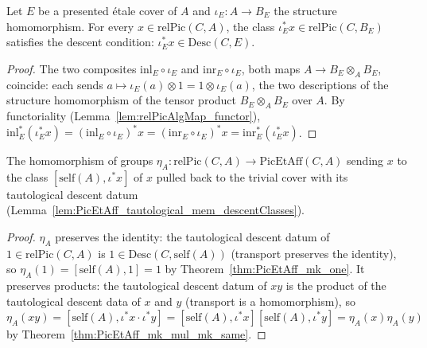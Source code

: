 \begin{lemma}
  \label{lem:PicEtAff_tautological_mem_descentClasses}
  \leanok
  Let \(E\) be a presented \'etale cover of \(A\) and \(\iota_E \colon A \to B_E\) the
  structure homomorphism. For every \(x \in \mathrm{relPic}(C,A)\), the class
  \(\iota_E^{*}x \in \mathrm{relPic}(C,B_E)\) satisfies the descent condition:
  \(\iota_E^{*}x \in \mathrm{Desc}(C,E)\).
\end{lemma}
\begin{proof}
  \leanok
  The two composites \(\mathrm{inl}_E \circ \iota_E\) and \(\mathrm{inr}_E \circ \iota_E\), both
  maps \(A \to B_E \otimes_A B_E\), coincide: each sends \(a \mapsto \iota_E(a) \otimes 1 = 1
  \otimes \iota_E(a)\), the two descriptions of the structure homomorphism of the tensor
  product \(B_E \otimes_A B_E\) over \(A\). By functoriality (Lemma~\ref{lem:relPicAlgMap_functor}),
  \(\mathrm{inl}_E^{*}(\iota_E^{*}x) = (\mathrm{inl}_E \circ \iota_E)^{*}x = (\mathrm{inr}_E
  \circ \iota_E)^{*}x = \mathrm{inr}_E^{*}(\iota_E^{*}x)\).
\end{proof}

\begin{definition}
  \label{def:PicEtAff_unit}
  \leanok
  The homomorphism of groups \(\eta_A \colon \mathrm{relPic}(C,A) \to
  \mathrm{PicEtAff}(C,A)\) sending \(x\) to the class \([\mathrm{self}(A), \iota^{*}x]\) of \(x\)
  pulled back to the trivial cover with its tautological descent datum
  (Lemma~\ref{lem:PicEtAff_tautological_mem_descentClasses}).
\end{definition}
\begin{proof}
  \leanok
  \(\eta_A\) preserves the identity: the tautological descent datum of \(1 \in
  \mathrm{relPic}(C,A)\) is \(1 \in \mathrm{Desc}(C,\mathrm{self}(A))\) (transport preserves
  the identity), so \(\eta_A(1) = [\mathrm{self}(A),1] = 1\) by
  Theorem~\ref{thm:PicEtAff_mk_one}. It preserves products: the tautological descent datum of
  \(xy\) is the product of the tautological descent data of \(x\) and \(y\) (transport is a
  homomorphism), so \(\eta_A(xy) = [\mathrm{self}(A), \iota^{*}x \cdot \iota^{*}y] =
  [\mathrm{self}(A),\iota^{*}x][\mathrm{self}(A),\iota^{*}y] = \eta_A(x)\eta_A(y)\) by
  Theorem~\ref{thm:PicEtAff_mk_mul_mk_same}.
\end{proof}

